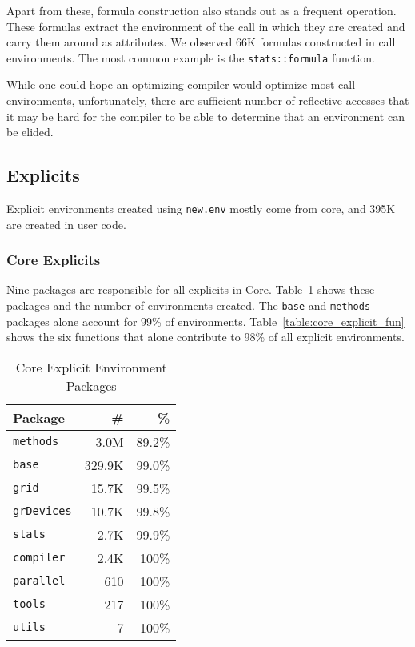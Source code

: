 \documentclass[sigplan,screen]{acmart}
\renewcommand{\c}[1]{\lstinline |#1|\xspace}
\newcommand{\newEnv}{\c{new.env}}
\begin{document}
\noindent
Apart from these, formula construction also stands out as a frequent operation.
These formulas extract the environment of the call in which they are created and
carry them around as attributes. We observed 66K formulas constructed in call
environments. The most common example is the \c{stats::formula} function.

While one could hope an optimizing compiler would optimize most call
environments, unfortunately, there are sufficient number of reflective accesses
that it may be hard for the compiler to be able to determine that an environment
can be elided.

\subsection{Explicits}

Explicit environments created using \newEnv mostly come from core, and 395K are
created in user code.

\subsubsection{Core Explicits}

Nine packages are responsible for all explicits in Core.
Table~\ref{table:core_explicit_pack} shows these packages and the number of
environments created. The \c{base} and \c{methods} packages alone account for
99\% of environments. Table~\ref{table:core_explicit_fun} shows the six
functions that alone contribute to 98\% of all explicit environments.

\begin{table}[!h]
  \small
  \caption{Core Explicit Environment Packages} \label{table:core_explicit_pack}
  \centering
  \begin{tabular}{lrr}
    \toprule
    \textbf{Package}&\textbf{\#}&\textbf{\%}\\
    \midrule
    \c{methods}&3.0M&89.2\%\\
    \c{base}&329.9K&99.0\%\\
    \c{grid}&15.7K&99.5\%\\
    \c{grDevices}&10.7K&99.8\%\\
    \c{stats}&2.7K&99.9\%\\
    \c{compiler}&2.4K&100\%\\
    \c{parallel}&610&100\%\\
    \c{tools}&217&100\%\\
    \c{utils}&7&100\%\\
    \bottomrule
  \end{tabular}
\end{table}
\end{document}

